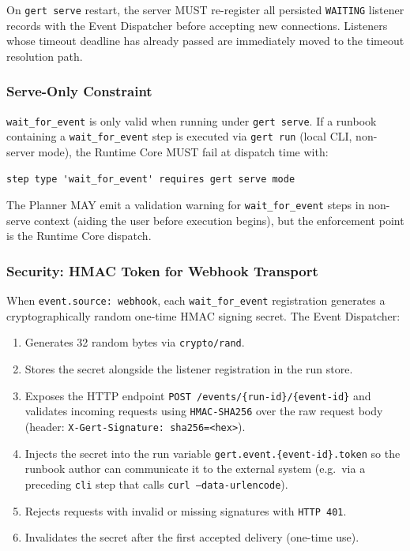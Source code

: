 On \texttt{gert serve} restart, the server MUST re-register all persisted \texttt{WAITING}
listener records with the Event Dispatcher before accepting new connections. Listeners whose
timeout deadline has already passed are immediately moved to the timeout resolution path.

\subsubsection*{Serve-Only Constraint}

\texttt{wait\_for\_event} is only valid when running under \texttt{gert serve}. If a runbook
containing a \texttt{wait\_for\_event} step is executed via \texttt{gert run} (local CLI,
non-server mode), the Runtime Core MUST fail at dispatch time with:

\begin{verbatim}
step type 'wait_for_event' requires gert serve mode
\end{verbatim}

The Planner MAY emit a validation warning for \texttt{wait\_for\_event} steps in non-serve
context (aiding the user before execution begins), but the enforcement point is the Runtime
Core dispatch.

\subsubsection*{Security: HMAC Token for Webhook Transport}

When \texttt{event.source: webhook}, each \texttt{wait\_for\_event} registration generates a
cryptographically random one-time HMAC signing secret. The Event Dispatcher:

\begin{enumerate}
  \item Generates 32 random bytes via \texttt{crypto/rand}.
  \item Stores the secret alongside the listener registration in the run store.
  \item Exposes the HTTP endpoint \texttt{POST /events/\{run-id\}/\{event-id\}} and
        validates incoming requests using \texttt{HMAC-SHA256} over the raw request body
        (header: \texttt{X-Gert-Signature: sha256=<hex>}).
  \item Injects the secret into the run variable
        \texttt{gert.event.\{event-id\}.token} so the runbook author can communicate it to
        the external system (e.g.\ via a preceding \texttt{cli} step that calls
        \texttt{curl --data-urlencode}).
  \item Rejects requests with invalid or missing signatures with \texttt{HTTP 401}.
  \item Invalidates the secret after the first accepted delivery (one-time use).
\end{enumerate}


